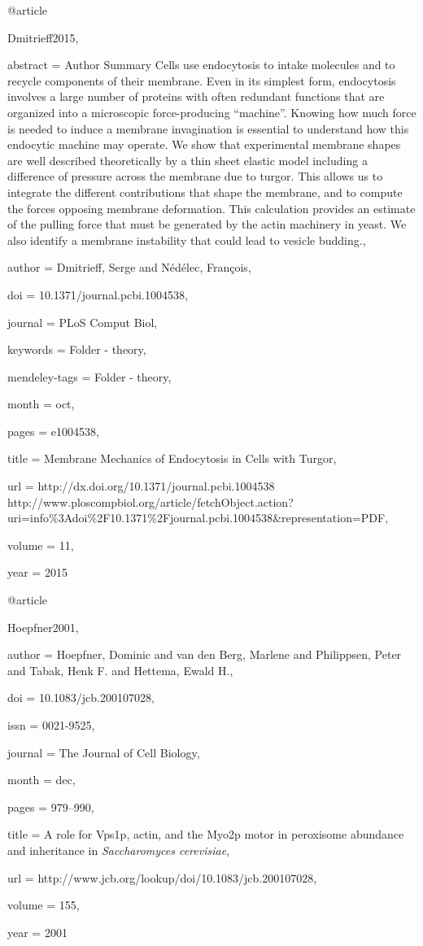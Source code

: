 @article{Dmitrieff2015,

abstract = {Author Summary Cells use endocytosis to intake molecules and to recycle components of their membrane. Even in its simplest form, endocytosis involves a large number of proteins with often redundant functions that are organized into a microscopic force-producing “machine”. Knowing how much force is needed to induce a membrane invagination is essential to understand how this endocytic machine may operate. We show that experimental membrane shapes are well described theoretically by a thin sheet elastic model including a difference of pressure across the membrane due to turgor. This allows us to integrate the different contributions that shape the membrane, and to compute the forces opposing membrane deformation. This calculation provides an estimate of the pulling force that must be generated by the actin machinery in yeast. We also identify a membrane instability that could lead to vesicle budding.},

author = {Dmitrieff, Serge and N{\'{e}}d{\'{e}}lec, Fran{\c{c}}ois},

doi = {10.1371/journal.pcbi.1004538},

journal = {PLoS Comput Biol},

keywords = {Folder - theory},

mendeley-tags = {Folder - theory},

month = {oct},

pages = {e1004538},

title = {{Membrane Mechanics of Endocytosis in Cells with Turgor}},

url = {http://dx.doi.org/10.1371/journal.pcbi.1004538 http://www.ploscompbiol.org/article/fetchObject.action?uri=info{\%}3Adoi{\%}2F10.1371{\%}2Fjournal.pcbi.1004538{\&}representation=PDF},

volume = {11},

year = {2015}

}

@article{Hoepfner2001,

author = {Hoepfner, Dominic and van den Berg, Marlene and Philippsen, Peter and Tabak, Henk F. and Hettema, Ewald H.},

doi = {10.1083/jcb.200107028},

issn = {0021-9525},

journal = {The Journal of Cell Biology},

month = {dec},

pages = {979--990},

title = {{A role for Vps1p, actin, and the Myo2p motor in peroxisome abundance and inheritance in \textit{Saccharomyces cerevisiae}}},

url = {http://www.jcb.org/lookup/doi/10.1083/jcb.200107028},

volume = {155},

year = {2001}

}

